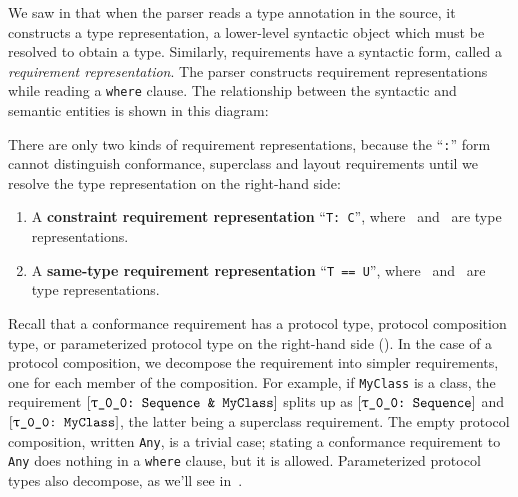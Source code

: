 \documentclass[../generics]{subfiles}
\begin{document}
We saw in  that when the parser reads a type annotation in the source, it constructs a type representation, a lower-level syntactic object which must be resolved to obtain a type. Similarly, requirements have a syntactic form, called a \emph{requirement representation}. The parser constructs requirement representations while reading a \texttt{where} clause. The relationship between the syntactic and semantic entities is shown in this diagram:
\begin{center}
\end{center}
There are only two kinds of requirement representations, because the ``\texttt{:}'' form cannot distinguish conformance, superclass and layout requirements until we resolve the type representation on the right-hand side:
\begin{enumerate}
\item A \textbf{constraint requirement representation} ``\texttt{T:\ C}'', where \tT\ and \tC\ are type representations.
\item A \textbf{same-type requirement representation} ``\texttt{T == U}'', where \tT\ and \tU\ are type representations.
\end{enumerate}

Recall that a conformance requirement has a protocol type, protocol composition type, or parameterized protocol type on the right-hand side (). In the case of a protocol composition, we decompose the requirement into simpler requirements, one for each member of the composition. For example, if \texttt{MyClass} is a class, the requirement $\ConfReq{\rT}{Sequence~\&~MyClass}$ splits up as $\rTSequence$ and $\ConfReq{\rT}{MyClass}$, the latter being a superclass requirement. The empty protocol composition, written \texttt{Any}, is a trivial case; stating a conformance requirement to \texttt{Any} does nothing in a \texttt{where} clause, but it is allowed. Parameterized protocol types also decompose, as we'll see in~.
\end{document}

